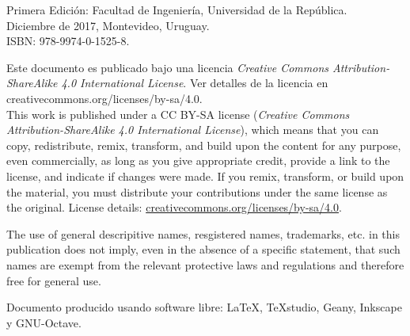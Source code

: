 \documentclass[spanish,twoside,openright,10pt]{book}
\begin{document}
\noindent
Primera Edición: Facultad de Ingeniería, Universidad de la República.\\
Diciembre de 2017, Montevideo, Uruguay.\\
ISBN: 978-9974-0-1525-8.\\

\vfill
\begin{small}

\noindent
Este documento es publicado bajo una licencia \textit{Creative Commons Attribution-ShareAlike 4.0 International License}. Ver detalles de la licencia en creativecommons.org/licenses/by-sa/4.0.\\

\noindent
This work is published under a CC BY-SA license (\textit{Creative Commons Attribution-ShareAlike 4.0 International License}), which means that you can copy, redistribute, remix, transform, and build upon the content for any purpose, even commercially, as long as you give appropriate credit, provide a link to the license, and indicate if changes were made. If you remix, transform, or build upon the material, you must distribute your contributions under the same license as the original. License details: \href{https://creativecommons.org/licenses/by-sa/4.0/}{creativecommons.org/licenses/by-sa/4.0}.

\vspace{2mm}

\noindent
The use of general descripitive names, resgistered names, trademarks, etc. in this publication does not imply, even in the absence of a specific statement, that such names are exempt from the relevant protective laws and regulations and therefore free for general use.

\end{small}

\vspace{3mm}

\noindent
\begin{footnotesize}
Documento producido usando software libre: \LaTeX, TeXstudio, Geany, Inkscape y GNU-Octave.
\end{footnotesize}

\tableofcontents
\thispagestyle{empty}

\mainmatter




 








%
%

\end{document}
